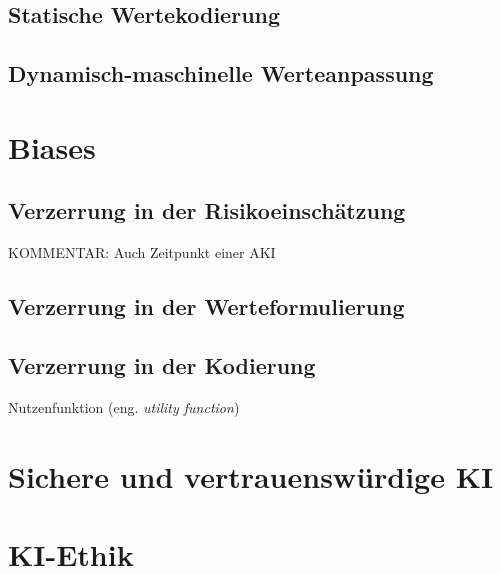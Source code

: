 \subsection{Statische Wertekodierung}
\subsection{Dynamisch-maschinelle Werteanpassung}
\section{Biases}
\subsection{Verzerrung in der Risikoeinschätzung}
KOMMENTAR: Auch Zeitpunkt einer AKI
\subsection{Verzerrung in der Werteformulierung}
\subsection{Verzerrung in der Kodierung}
Nutzenfunktion (eng. \emph{utility function})
\section{Sichere und vertrauenswürdige KI}
\section{KI-Ethik}

